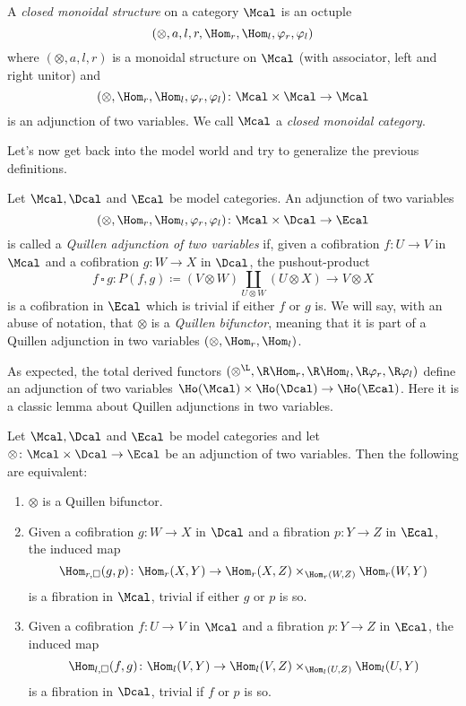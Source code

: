         \begin{defn}
            \label{defn:closed_monoidal_structure}
            A \emph{closed monoidal structure} on a category $\Mcal$ is an octuple \[(\otimes, a, l, r, \Hom_r, \Hom_l, \varphi_r, \varphi_l) \] where $(\otimes, a, l, r)$ is a monoidal structure on $\Mcal$ (with associator, left and right unitor) and \[(\otimes, \Hom_r, \Hom_l, \varphi_r, \varphi_l)\colon \Mcal \times \Mcal \to \Mcal\] is an adjunction of two variables. We call $\Mcal$ a \emph{closed monoidal category}.
        \end{defn}

        Let's now get back into the model world and try to generalize the previous definitions.
        \begin{defn}
            \label{defn:quillen_adjunction_variable}
            Let $\Mcal, \Dcal$ and $\Ecal$ be model categories. An adjunction of two variables 
            \[(\otimes, \Hom_r, \Hom_l, \varphi_r, \varphi_l)\colon \Mcal \times \Dcal \to \Ecal\] is called a \emph{Quillen adjunction of two variables} if, given a cofibration $f\colon U \to V$ in $\Mcal$ and a cofibration $g\colon W \to X$ in $\Dcal$, the pushout-product \[f\,\square\, g\colon P(f, g) \coloneqq (V \otimes W) \coprod_{U \otimes W} (U \otimes X) \to V \otimes X \] is a cofibration in $\Ecal$ which is trivial if either $f$ or $g$ is. 
            We will say, with an abuse of notation, that $\otimes$ is a \emph{Quillen bifunctor}, meaning that it is part of a Quillen adjunction in two variables $(\otimes, \Hom_r, \Hom_l)$.
        \end{defn}
        As expected, the total derived functors $(\otimes^{\L}, \R\Hom_r, \R\Hom_l, \R\varphi_r, \R\varphi_l)$ define an adjunction of two variables $\Ho(\Mcal) \times \Ho(\Dcal) \to \Ho(\Ecal)$.
        Here it is a classic lemma about Quillen adjunctions in two variables.
        \begin{lemma}
            \label{lemma:properties_quillen_bifunctors}
            Let $\Mcal, \Dcal$ and $\Ecal$ be model categories and let $\otimes\colon \Mcal \times \Dcal \to \Ecal$ be an adjunction of two variables. Then the following are equivalent:
            \begin{enumerate}
                \item $\otimes$ is a Quillen bifunctor.
                \item Given a cofibration $g\colon W \to X$ in $\Dcal$ and a fibration $p\colon Y \to Z$ in $\Ecal$, the induced map \[\Hom_{r, \square}(g, p)\colon \Hom_r(X, Y) \to \Hom_r(X, Z) \times_{\Hom_r(W, Z)} \Hom_r(W, Y) \] is a fibration in $\Mcal$, trivial if either $g$ or $p$ is so.
                \item Given a cofibration $f\colon U \to V$ in $\Mcal$ and a fibration $p\colon Y \to Z$ in $\Ecal$, the induced map \[\Hom_{l, \square}(f, g)\colon \Hom_l(V, Y) \to \Hom_l(V, Z) \times_{\Hom_l(U, Z)} \Hom_l(U, Y) \] is a fibration in $\Dcal$, trivial if $f$ or $p$ is so.
            \end{enumerate}
        \end{lemma}
